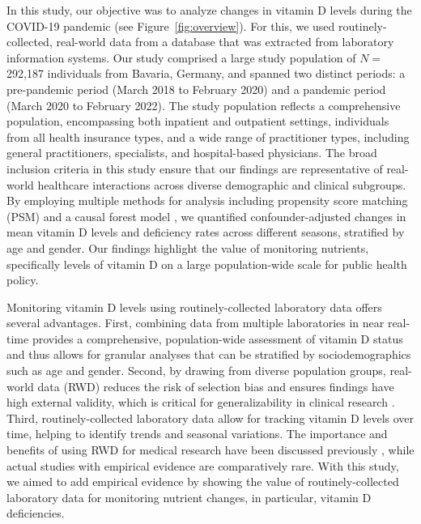 \documentclass[12pt]{article}
\begin{document}
In this study, our objective was to analyze changes in vitamin D levels during the COVID-19 pandemic (see Figure~\ref{fig:overview}). For this, we used routinely-collected, real-world data from a database \cite{honic} that was extracted from laboratory information systems. Our study comprised a large study population of $N=$ 292,187 individuals from Bavaria, Germany, and spanned two distinct periods: a pre-pandemic period (March 2018 to February 2020) and a pandemic period (March 2020 to February 2022). The study population reflects a comprehensive population, encompassing both inpatient and outpatient settings, individuals from all health insurance types, and a wide range of practitioner types, including general practitioners, specialists, and hospital-based physicians. The broad inclusion criteria in this study ensure that our findings are representative of real-world healthcare interactions across diverse demographic and clinical subgroups. By employing multiple methods for analysis including propensity score matching (PSM) and a causal forest model \cite{Athey2019, Wager2018}, we quantified confounder-adjusted changes in mean vitamin D levels and deficiency rates across different seasons, stratified by age and gender. Our findings highlight the value of monitoring nutrients, specifically levels of vitamin D on a large population-wide scale for public health policy.

Monitoring vitamin D levels using routinely-collected laboratory data offers several advantages. First, combining data from multiple laboratories in near real-time provides a comprehensive, population-wide assessment of vitamin D status and thus allows for granular analyses that can be stratified by sociodemographics such as age and gender. Second, by drawing from diverse population groups, real-world data (RWD) reduces the risk of selection bias and ensures findings have high external validity, which is critical for generalizability in clinical research \cite{Saesen2023}. Third, routinely-collected laboratory data allow for tracking vitamin D levels over time, helping to identify trends and seasonal variations. The importance and benefits of using RWD for medical research have been discussed previously \cite{Booth2019,Hong2021}, while actual studies with empirical evidence are comparatively rare. With this study, we aimed to add empirical evidence by showing the value of routinely-collected laboratory data for monitoring nutrient changes, in particular, vitamin D deficiencies.

\clearpage
\end{document}
